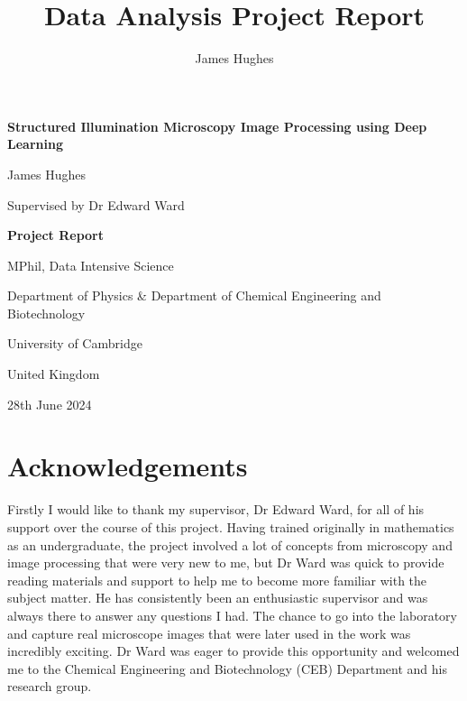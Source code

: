 \documentclass[12pt]{article}
\title{Data Analysis Project Report}
\author{James Hughes}
\begin{document}
\begin{titlepage}
    \begin{center}
        \vspace*{5cm}

        \Huge
        \textbf{Structured Illumination Microscopy Image Processing using Deep Learning}

        \vspace{0.5cm}
        \LARGE

        James Hughes

        Supervised by Dr Edward Ward

        \vspace{2cm}
        \Huge
        \textbf{Project Report}

        \vfill

        MPhil, Data Intensive Science

        \vspace{0.8cm}

        \Large
        Department of Physics \& Department of Chemical Engineering and Biotechnology

        University of Cambridge

        United Kingdom

        28th June 2024

    \end{center}
\end{titlepage}


\newpage
\section*{Acknowledgements}

Firstly I would like to thank my supervisor, Dr Edward Ward, for all of his support over the course of this project.
Having trained originally in mathematics as an undergraduate,
the project involved a lot of concepts from microscopy and image processing that were very new to me,
but Dr Ward was quick to provide reading materials and support to help me to become more familiar with the subject matter.
He has consistently been an enthusiastic supervisor and was always there to answer any questions I had.
The chance to go into the laboratory and capture real microscope images that were later used in the work was incredibly exciting.
Dr Ward was eager to provide this opportunity and welcomed me to the Chemical Engineering and Biotechnology (CEB) Department and his research group.
\end{document}
